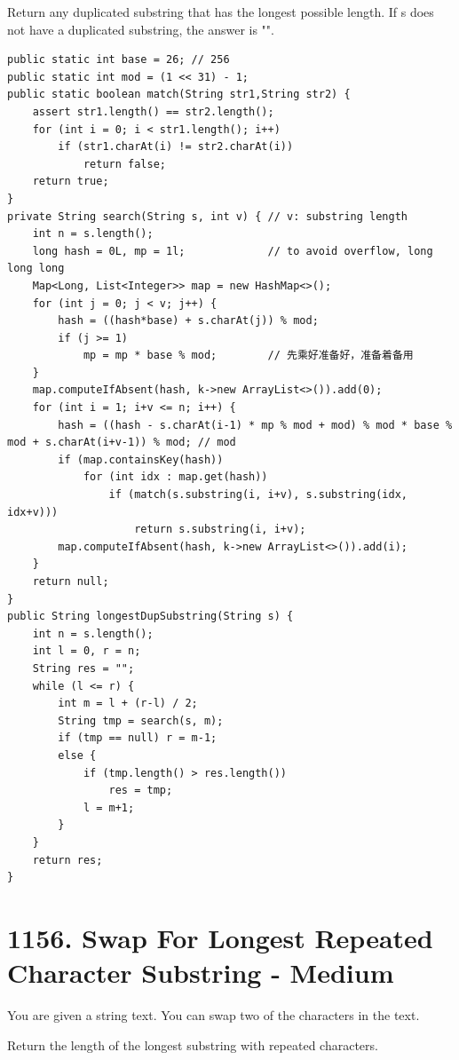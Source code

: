 \documentclass[9pt, b5paaper]{book}
\begin{document}
Return any duplicated substring that has the longest possible length. If s does not have a duplicated substring, the answer is "".
\begin{verbatim}
public static int base = 26; // 256
public static int mod = (1 << 31) - 1;
public static boolean match(String str1,String str2) {
    assert str1.length() == str2.length();
    for (int i = 0; i < str1.length(); i++) 
        if (str1.charAt(i) != str2.charAt(i))
            return false; 
    return true; 
}
private String search(String s, int v) { // v: substring length
    int n = s.length();
    long hash = 0L, mp = 1l;             // to avoid overflow, long long long
    Map<Long, List<Integer>> map = new HashMap<>();
    for (int j = 0; j < v; j++) {
        hash = ((hash*base) + s.charAt(j)) % mod;
        if (j >= 1)
            mp = mp * base % mod;        // 先乘好准备好，准备着备用 
    }
    map.computeIfAbsent(hash, k->new ArrayList<>()).add(0);
    for (int i = 1; i+v <= n; i++) {
        hash = ((hash - s.charAt(i-1) * mp % mod + mod) % mod * base % mod + s.charAt(i+v-1)) % mod; // mod 
        if (map.containsKey(hash)) 
            for (int idx : map.get(hash)) 
                if (match(s.substring(i, i+v), s.substring(idx, idx+v)))
                    return s.substring(i, i+v);
        map.computeIfAbsent(hash, k->new ArrayList<>()).add(i);
    }
    return null;
}
public String longestDupSubstring(String s) {
    int n = s.length();
    int l = 0, r = n;
    String res = "";
    while (l <= r) {
        int m = l + (r-l) / 2;
        String tmp = search(s, m);
        if (tmp == null) r = m-1;
        else {
            if (tmp.length() > res.length())
                res = tmp;
            l = m+1;
        }
    }
    return res;
}
\end{verbatim}

\section{1156. Swap For Longest Repeated Character Substring - Medium}
\label{sec-6-5}
You are given a string text. You can swap two of the characters in the text.

Return the length of the longest substring with repeated characters.
\end{document}
